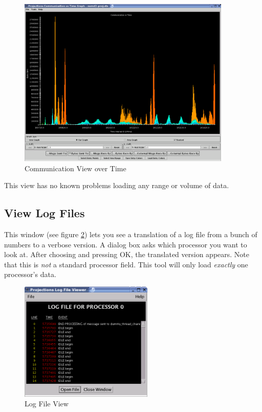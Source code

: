 \documentclass[10pt]{report}
\begin{document}
\begin{figure}[htb]
\center
\includegraphics[width=4.0in]{fig/apoa1_512_CommTimeProfile}
\caption{Communication View over Time}
\label{communication-time}
\end{figure}

This view has no known problems loading any range or volume of data.

\subsection{View Log Files}

This window (see figure \ref{viewlog}) lets you see a translation of a
log file from a bunch of numbers to a verbose version.  A dialog box
asks which processor you want to look at.  After choosing and pressing
OK, the translated version appears. Note that this is {\it not} a
standard processor field. This tool will only load {\it exactly} one
processor's data.

\begin{figure}[htb]
\center
\includegraphics[width=2.5in]{fig/viewlog}
\caption{Log File View}
\label{viewlog}
\end{figure}
\end{document}
